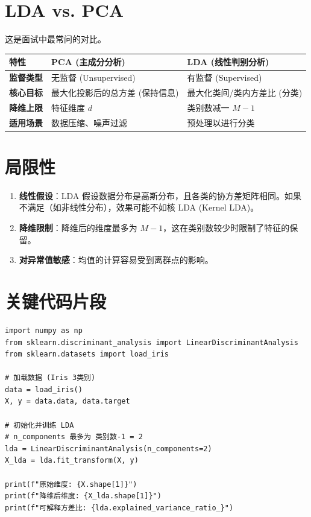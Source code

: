 \documentclass[12pt, a4paper]{book}
\begin{document}
\section{LDA vs. PCA}
这是面试中最常问的对比。
\begin{table}[h]
\centering
\begin{tabularx}{\textwidth}{|l|X|X|}
\hline
\textbf{特性} & \textbf{PCA (主成分分析)} & \textbf{LDA (线性判别分析)} \\
\hline
\textbf{监督类型} & 无监督 (Unsupervised) & 有监督 (Supervised) \\
\hline
\textbf{核心目标} & 最大化投影后的总方差 (保持信息) & 最大化类间/类内方差比 (分类) \\
\hline
\textbf{降维上限} & 特征维度 $d$ & 类别数减一 $M-1$ \\
\hline
\textbf{适用场景} & 数据压缩、噪声过滤 & 预处理以进行分类 \\
\hline
\end{tabularx}
\end{table}

\section{局限性}
\begin{enumerate}
    \item \textbf{线性假设}：LDA 假设数据分布是高斯分布，且各类的协方差矩阵相同。如果不满足（如非线性分布），效果可能不如核 LDA (Kernel LDA)。
    \item \textbf{降维限制}：降维后的维度最多为 $M-1$，这在类别数较少时限制了特征的保留。
    \item \textbf{对异常值敏感}：均值的计算容易受到离群点的影响。
\end{enumerate}

\section{关键代码片段}
\begin{lstlisting}
import numpy as np
from sklearn.discriminant_analysis import LinearDiscriminantAnalysis
from sklearn.datasets import load_iris

# 加载数据 (Iris 3类别)
data = load_iris()
X, y = data.data, data.target

# 初始化并训练 LDA
# n_components 最多为 类别数-1 = 2
lda = LinearDiscriminantAnalysis(n_components=2)
X_lda = lda.fit_transform(X, y)

print(f"原始维度: {X.shape[1]}")
print(f"降维后维度: {X_lda.shape[1]}")
print(f"可解释方差比: {lda.explained_variance_ratio_}")
\end{lstlisting}
\end{document}
